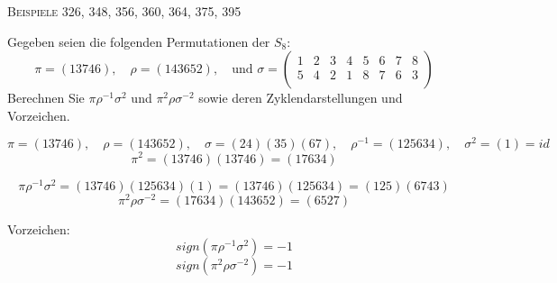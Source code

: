 \documentclass[a4paper, 12pt, margins=3cm]{homework}
\begin{document}
  \begin{center}
    \textsc{Beispiele 326, 348, 356, 360, 364, 375, 395}
  \end{center}


  \begin{problem}
    Gegeben seien die folgenden Permutationen der $S_8$:
    \[ \pi = (13746),\quad \rho = (143652),\quad \text{und } \sigma = 
        \begin{pmatrix}
            1 & 2 & 3 & 4 & 5 & 6 & 7 & 8 \\
            5 & 4 & 2 & 1 & 8 & 7 & 6 & 3 \\
        \end{pmatrix}
    \]
    Berechnen Sie $\pi\rho^{-1}\sigma^2$ und $\pi^2\rho\sigma^{-2}$ sowie deren
    Zyklendarstellungen und Vorzeichen.
  \end{problem}
  \begin{solution}
    \[ \pi = (13746), \quad \rho = (143652),\quad \sigma = (24)(35)(67),\quad \rho^{-1} = (125634), \quad \sigma^2 = (1) = id \]
    \[ \pi^2 = (13746)(13746) = (17634) \]

    \[ \pi\rho^{-1}\sigma^2 = (13746)(125634)(1) = (13746)(125634) = (125)(6743) \]
    \[ \pi^2\rho\sigma^{-2} = (17634)(143652)= (6527) \]

    Vorzeichen:
    \[ sign(\pi\rho^{-1}\sigma^2) = -1 \]
    \[ sign(\pi^2\rho\sigma^{-2}) = -1 \]
  \end{solution}
\end{document}
